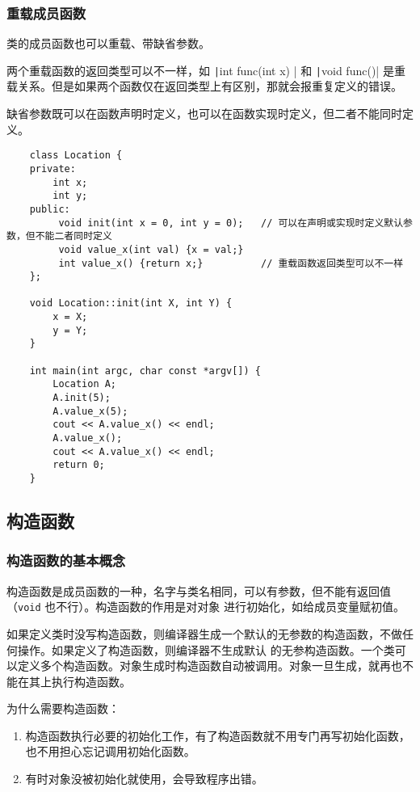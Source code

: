 \documentclass[UTF8]{ctexart}
\begin{document}
\subsubsection{重载成员函数}
类的成员函数也可以重载、带缺省参数。

两个重载函数的返回类型可以不一样，如 \texttt|int func(int x) {}| 和
\texttt|void func(){}| 是重载关系。但是如果两个函数仅在返回类型上有区别，那就会报重复定义的错误。

缺省参数既可以在函数声明时定义，也可以在函数实现时定义，但二者不能同时定义。

\begin{verbatim}
    class Location {
    private:
        int x;
        int y;
    public:
         void init(int x = 0, int y = 0);   // 可以在声明或实现时定义默认参数，但不能二者同时定义
         void value_x(int val) {x = val;}
         int value_x() {return x;}          // 重载函数返回类型可以不一样
    };

    void Location::init(int X, int Y) {
        x = X;
        y = Y;
    }

    int main(int argc, char const *argv[]) {
        Location A;
        A.init(5);
        A.value_x(5);
        cout << A.value_x() << endl;
        A.value_x();
        cout << A.value_x() << endl;
        return 0;
    }
\end{verbatim}

\subsection{构造函数}
\subsubsection{构造函数的基本概念}
构造函数是成员函数的一种，名字与类名相同，可以有参数，但不能有返回值（\texttt{void} 也不行）。构造函数的作用是对对象
进行初始化，如给成员变量赋初值。

如果定义类时没写构造函数，则编译器生成一个默认的无参数的构造函数，不做任何操作。如果定义了构造函数，则编译器不生成默认
的无参构造函数。一个类可以定义多个构造函数。对象生成时构造函数自动被调用。对象一旦生成，就再也不能在其上执行构造函数。

为什么需要构造函数：
\begin{enumerate}
    \item 构造函数执行必要的初始化工作，有了构造函数就不用专门再写初始化函数，也不用担心忘记调用初始化函数。
    \item 有时对象没被初始化就使用，会导致程序出错。
\end{enumerate}
\end{document}
